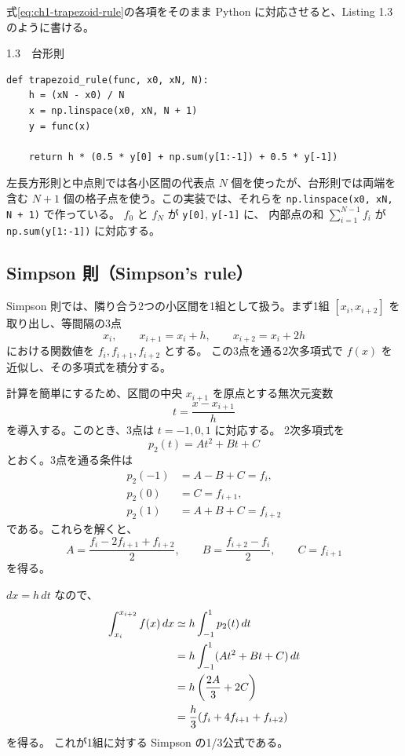 式\eqref{eq:ch1-trapezoid-rule}の各項をそのまま Python に対応させると、Listing 1.3 のように書ける。
\begin{listingbox}{1.3　台形則}
\begin{Verbatim}[fontsize=\small]
def trapezoid_rule(func, x0, xN, N):
    h = (xN - x0) / N
    x = np.linspace(x0, xN, N + 1)
    y = func(x)

    return h * (0.5 * y[0] + np.sum(y[1:-1]) + 0.5 * y[-1])
\end{Verbatim}
\end{listingbox}
左長方形則と中点則では各小区間の代表点 $N$ 個を使ったが、台形則では両端を含む $N+1$ 個の格子点を使う。この実装では、それらを \texttt{np.linspace(x0, xN, N + 1)} で作っている。
$f_0$ と $f_N$ が \texttt{y[0]}, \texttt{y[-1]} に、
内部点の和 $\sum_{i=1}^{N-1}f_i$ が \texttt{np.sum(y[1:-1])} に対応する。


\subsection{Simpson 則（Simpson's rule）}
Simpson 則では、隣り合う2つの小区間を1組として扱う。まず1組 $[x_i,x_{i+2}]$ を取り出し、等間隔の3点
\begin{equation}
 x_i,\qquad x_{i+1}=x_i+h,\qquad x_{i+2}=x_i+2h
\label{eq:ch1-simpson-nodes}
\end{equation}
における関数値を $f_i,f_{i+1},f_{i+2}$ とする。
この3点を通る2次多項式で $f(x)$ を近似し、その多項式を積分する。

計算を簡単にするため、区間の中央 $x_{i+1}$ を原点とする無次元変数
\begin{equation}
 t=\frac{x-x_{i+1}}{h}
\label{eq:ch1-simpson-t}
\end{equation}
を導入する。このとき、3点は $t=-1,0,1$ に対応する。
2次多項式を
\begin{equation}
 p_2(t)=At^2+Bt+C
\end{equation}
とおく。3点を通る条件は
\begin{align}
 p_2(-1)&=A-B+C=f_i,\\
 p_2(0)&=C=f_{i+1},\\
 p_2(1)&=A+B+C=f_{i+2}
\end{align}
である。これらを解くと、
\begin{equation}
 A=\frac{f_i-2f_{i+1}+f_{i+2}}{2},\qquad
 B=\frac{f_{i+2}-f_i}{2},\qquad
 C=f_{i+1}
\end{equation}
を得る。

$dx=h\,dt$ なので、
\begin{align}
 \int_{x_i}^{x_{i+2}}f(x)\,dx
 &\simeq h\int_{-1}^{1}p_2(t)\,dt
 \label{eq:ch1-simpson-integral-p2}\\
 &=h\int_{-1}^{1}(At^2+Bt+C)\,dt \notag\\
 &=h\left(\frac{2A}{3}+2C\right) \notag\\
 &=\frac{h}{3}(f_i+4f_{i+1}+f_{i+2})
 \label{eq:ch1-simpson-panel}
\end{align}
を得る。
これが1組に対する Simpson の1/3公式である\cite{kouya2021}。

